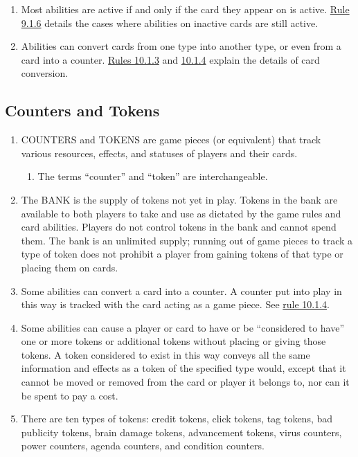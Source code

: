 \begin{enumerate}
\begin{enumerate}
	\end{enumerate}
	\item Most abilities are active if and only if the card they appear on is active. \hyperlink{page.i}{Rule 9.1.6} details the cases where abilities on inactive cards are still active.
	\item Abilities can convert cards from one type into another type, or even from a card into a counter. \hyperlink{page.i}{Rules 10.1.3} and \hyperlink{page.i}{10.1.4} explain the details of card conversion.
\end{enumerate}
\subsection{Counters and Tokens}
\begin{enumerate}
	\item COUNTERS and TOKENS are game pieces (or equivalent) that track various resources, effects, and statuses of players and their cards.
	      \begin{enumerate}
		      \item The terms ``counter'' and ``token'' are interchangeable.
	      \end{enumerate}
	\item The BANK is the supply of tokens not yet in play. Tokens in the bank are available to both players to take and use as dictated by the game rules and card abilities. Players do not control tokens in the bank and cannot spend them. The bank is an unlimited supply; running out of game pieces to track a type of token does not prohibit a player from \textcolor{Bittersweet}{gaining tokens of that type or placing them on cards}.
	\item Some abilities can convert a card into a counter. A counter put into play in this way is tracked \textcolor{Bittersweet}{with} the card \textcolor{Bittersweet}{acting} as a game piece. See \hyperlink{page.i}{rule 10.1.4}.
	\item Some abilities can cause a player or card to have or be ``considered to have'' one or more tokens or additional tokens without placing or giving those tokens. A token considered to exist in this way conveys all the same information and effects as a token of the specified type would, except that it cannot be moved or removed from the card or player it belongs to, nor can it be spent to pay a cost.
	\item There are ten types of tokens: credit tokens, click tokens, tag tokens, bad publicity tokens, brain damage tokens, advancement tokens, virus counters, power counters, agenda counters, and condition counters.

\end{enumerate}
